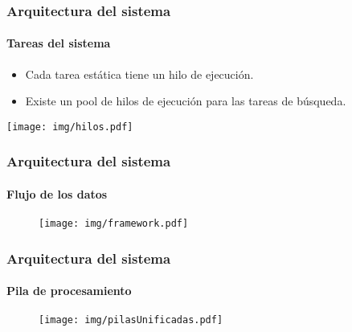 \documentclass[11pt,a4paper,spanish]{beamer}
\begin{document}
\begin{frame}

\frametitle{Arquitectura del sistema}

\framesubtitle{Tareas del sistema}

\begin{itemize}

	\item Cada tarea estática tiene un hilo de ejecución.

	\item Existe un pool de hilos de ejecución para las tareas de búsqueda.

\end{itemize}

\texttt{[image: img/hilos.pdf]}

\end{frame}

\begin{frame}

\frametitle{Arquitectura del sistema}

\framesubtitle{Flujo de los datos}

\begin{figure}[h]

	\centering

	\texttt{[image: img/framework.pdf]}

\end{figure}

\end{frame}

\begin{frame}

\frametitle{Arquitectura del sistema}

\framesubtitle{Pila de procesamiento}

\begin{figure}[h]

	\centering

	\texttt{[image: img/pilasUnificadas.pdf]}

\end{figure}

\end{frame}
\end{document}
